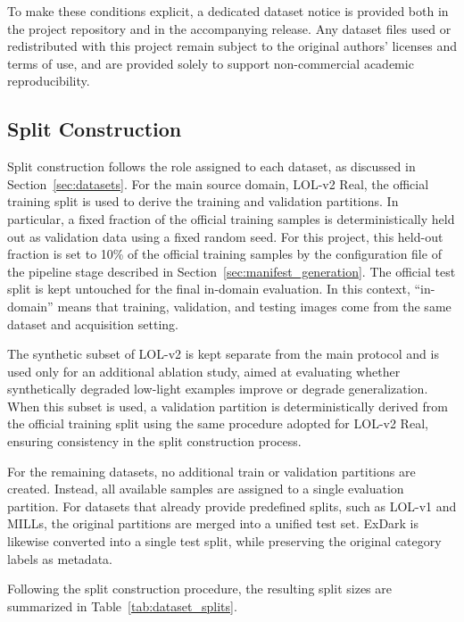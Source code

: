 To make these conditions explicit, a dedicated dataset notice is provided both in the project repository and in the accompanying release. Any dataset files used or redistributed with this project remain subject to the original authors’ licenses and terms of use, and are provided solely to support non-commercial academic reproducibility.

\subsection{Split Construction}

Split construction follows the role assigned to each dataset, as discussed in Section~\ref{sec:datasets}. For the main source domain, LOL-v2 Real, the official training split is used to derive the training and validation partitions. In particular, a fixed fraction of the official training samples is deterministically held out as validation data using a fixed random seed. For this project, this held-out fraction is set to 10\% of the official training samples by the configuration file of the pipeline stage described in Section~\ref{sec:manifest_generation}. The official test split is kept untouched for the final in-domain evaluation. In this context, ``in-domain'' means that training, validation, and testing images come from the same dataset and acquisition setting.

The synthetic subset of LOL-v2 is kept separate from the main protocol and is used only for an additional ablation study, aimed at evaluating whether synthetically degraded low-light examples improve or degrade generalization. When this subset is used, a validation partition is deterministically derived from the official training split using the same procedure adopted for LOL-v2 Real, ensuring consistency in the split construction process.

For the remaining datasets, no additional train or validation partitions are created. Instead, all available samples are assigned to a single evaluation partition. For datasets that already provide predefined splits, such as LOL-v1 and MILLs, the original partitions are merged into a unified test set. ExDark is likewise converted into a single test split, while preserving the original category labels as metadata.

Following the split construction procedure, the resulting split sizes are summarized in Table~\ref{tab:dataset_splits}.

